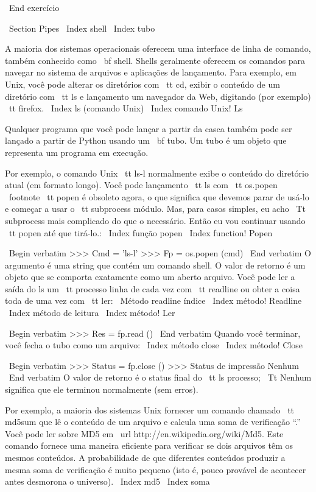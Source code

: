 \documentclass[10pt]{book}
\begin{document}
{{{{{{{{{{\ End {} exercício


\ Section {} Pipes
\ Index {shell}
\ Index {} tubo

A maioria dos sistemas operacionais oferecem uma interface de linha de comando,
também conhecido como {\ bf shell}. Shells geralmente oferecem os comandos
para navegar no sistema de arquivos e aplicações de lançamento. Para
exemplo, em Unix, você pode alterar os diretórios com {\ tt cd},
exibir o conteúdo de um diretório com {\ tt ls} e lançamento
um navegador da Web, digitando (por exemplo) {\ tt firefox}.
\ Index {ls (comando Unix)}
\ Index {comando Unix! Ls}

Qualquer programa que você pode lançar a partir da casca também pode ser
lançado a partir de Python usando um {\ bf tubo}. Um tubo é um objeto
que representa um programa em execução.

Por exemplo, o comando Unix {\ tt ls-l} normalmente exibe o
conteúdo do diretório atual (em formato longo). Você pode
lançamento {\ tt ls} com {\ tt os.popen} \ footnote {{\ tt popen} é obsoleto
agora, o que significa que devemos parar de usá-lo e começar a usar
o {\ tt subprocess} módulo. Mas, para casos simples, eu acho
{\ Tt subprocess} mais complicado do que o necessário. Então eu vou
continuar usando {\ tt popen} até que tirá-lo}.:
\ Index {função popen}
\ Index {function! Popen}

\ Begin {verbatim}
>>> Cmd = 'ls-l'
>>> Fp = os.popen (cmd)
\ End {verbatim}
%
O argumento é uma string que contém um comando shell. O
valor de retorno é um objeto que se comporta exatamente como um aberto
arquivo. Você pode ler a saída do ls um {\ tt} processo
linha de cada vez com {\ tt readline} ou obter a coisa toda de
uma vez com {\ tt ler}:
\ {Método readline} índice
\ Index {método! Readline}
\ Index {método de leitura}
\ Index {método! Ler}

\ Begin {verbatim}
>>> Res = fp.read ()
\ End {verbatim}
%
Quando você terminar, você fecha o tubo como um arquivo:
\ Index {método close}
\ Index {método! Close}

\ Begin {verbatim}
>>> Status = fp.close ()
>>> Status de impressão
Nenhum
\ End {verbatim}
%
O valor de retorno é o status final do {\ tt ls} processo;
{\ Tt Nenhum} significa que ele terminou normalmente (sem erros).

Por exemplo, a maioria dos sistemas Unix fornecer um comando chamado {\ tt md5sum}
que lê o conteúdo de um arquivo e calcula uma soma de verificação ``.''
Você pode ler sobre MD5 em \ url {http://en.wikipedia.org/wiki/Md5}. Este
comando fornece uma maneira eficiente para verificar se dois arquivos
têm os mesmos conteúdos. A probabilidade de que diferentes conteúdos
produzir a mesma soma de verificação é muito pequeno (isto é, pouco provável de acontecer
antes desmorona o universo).
\ Index {md5}
\ Index {soma}

}}}}}}}}}}
\end{document}
